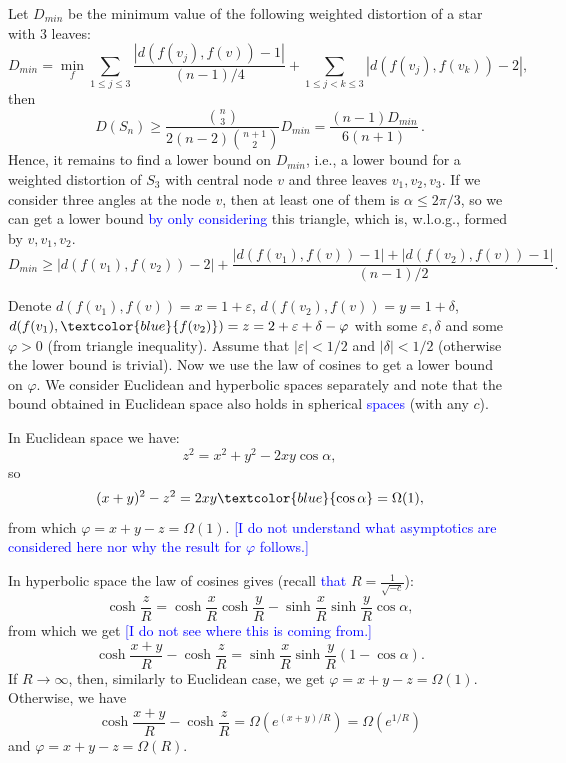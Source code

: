 \documentclass{article} %
\newcommand{\ph}[1]{\textcolor{blue}{#1}}
\begin{document}
Let $D_{min}$ be the minimum value of the following weighted distortion of a star with 3 leaves:
\[
D_{min} = \min_{f} \sum_{1\le j \le 3}  \frac{|d(f(v_j),f(v)) - 1|}{(n-1)/4} +
\sum_{1\le j < k\le 3}  |d(f(v_j),f(v_k)) - 2|,
\]
then 
\begin{equation}\label{eq:D_min}
D(S_n) \ge \frac{{n\choose 3}}{2(n-2){n+1 \choose 2}} D_{min} = \frac{ (n-1)D_{min}}{6(n+1)}\,.
\end{equation}
Hence, it remains to find a lower bound on $D_{min}$, i.e., a lower bound for a weighted distortion of $S_3$ with central node $v$ and three leaves $v_1, v_2, v_3$.
If we consider three angles at the node $v$, then at least one of them is $\alpha \le 2 \pi / 3$, so we can get a lower bound \ph{by only considering} this triangle, which is, w.l.o.g., formed by $v, v_1, v_2$.
\[
D_{min} \ge  |d(f(v_1),f(v_2)) - 2| + \frac{|d(f(v_1),f(v)) - 1| + |d(f(v_2),f(v)) - 1|}{(n-1)/2}.
\]

Denote $d(f(v_1),f(v)) = x = 1 + \varepsilon$, $d(f(v_2),f(v)) = y = 1 + \delta$, $d(f(v_1),\ph{f(v_2)}) = z = 2 + \varepsilon + \delta - \varphi$ with some $\varepsilon, \delta$ and some $\varphi > 0$ (from triangle inequality). Assume that $|\varepsilon| < 1/2$ and $|\delta| < 1/2$ (otherwise the lower bound is trivial). Now we use the law of cosines to get a lower bound on $\varphi$.
We consider Euclidean and hyperbolic spaces separately and note that the bound obtained in Euclidean space also holds in spherical \ph{spaces} (with any $c$).

In Euclidean space we have:
\[
z^2 = x^2 + y^2 - 2 x y \cos \alpha, 
\]
so 
\[
(x+y)^2 - z^2 = 2 x y \ph{\cos \alpha} = \Omega(1),
\]
from which $\varphi = x + y - z = \Omega(1)$. \ph{[I do not understand what asymptotics are considered here nor why the result for $\varphi$ follows.]}

In hyperbolic space the law of cosines gives 
(recall \ph{that} $R = \frac{1}{\sqrt{-c}}$):
\[
\cosh \frac{z}{R} = \cosh \frac{x}{R} \cosh \frac{y}{R} - \sinh \frac{x}{R} \sinh \frac{y}{R} \cos \alpha,
\]
from which we get \ph{[I do not see where this is coming from.]}
\[
\cosh \frac{x+y}{R} - \cosh \frac{z}{R} = \sinh \frac{x}{R} \sinh \frac{y}{R} (1 - \cos \alpha). %
\]
If $R \to \infty$, then, similarly to Euclidean case, we get $\varphi = x + y - z = \Omega(1)$. Otherwise, we have
\[
\cosh \frac{x+y}{R} - \cosh \frac{z}{R} = \Omega\left(e^{(x+y)/R}\right) = \Omega\left(e^{1/R}\right)
\]
and
$\varphi = x + y - z = \Omega(R)$.
\end{document}

